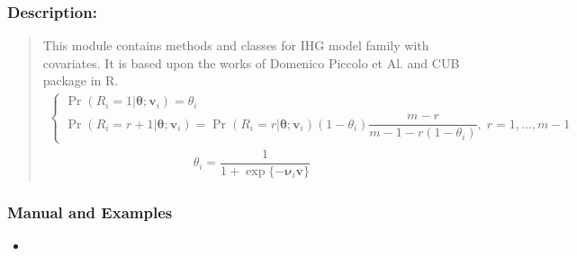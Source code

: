 \documentclass[letterpaper,10pt,english]{sphinxmanual}
\begin{document}
\subsubsection{Description:}
\label{\detokenize{cubmods:id799}}\begin{quote}

\sphinxAtStartPar
This module contains methods and classes
for IHG model family with covariates.
It is based upon the works of Domenico
Piccolo et Al. and CUB package in R.
\begin{equation*}
\begin{split}\left\{
\begin{array}{l}
    \Pr(R_i=1|\pmb\theta;\pmb v_i) = \theta_i
    \\
    \Pr(R_i=r+1|\pmb\theta;\pmb v_i) = \Pr(R_i=r|\pmb\theta ; \pmb v_i)(1-\theta_i)\dfrac{m-r}{m-1-r(1-\theta_i)},\; r= 1, \ldots, m-1
\end{array}
\right.\end{split}
\end{equation*}\begin{equation*}
\begin{split}\theta_i = \dfrac{1}{1 + \exp\{ - \pmb \nu_i \pmb v \}}\end{split}
\end{equation*}\end{quote}


\subsubsection{Manual and Examples}
\label{\detokenize{cubmods:id800}}\begin{itemize}
\item {} 
\sphinxAtStartPar
{}

\end{itemize}
\end{document}
